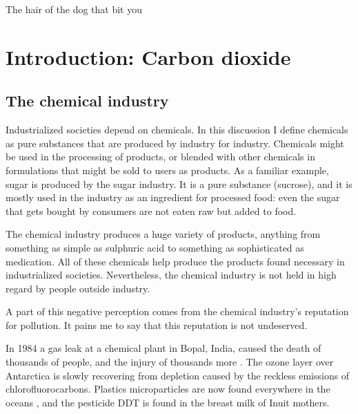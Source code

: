 
\begin{savequote}[45mm]
The hair of the dog that bit you
\end{savequote}

\chapter{Introduction: Carbon dioxide } %

\label{Chapter2} %


\section{The chemical industry}

Industrialized societies depend on chemicals. In this discussion I define
chemicals as pure substances that are produced by industry for industry.
Chemicals might be used in the processing of products, or blended with other
chemicals in formulations that might be sold to users as products. As a familiar
example, sugar is produced by the sugar industry. It is a pure substance
(sucrose), and it is mostly used in the industry as an ingredient for processed
food: even the sugar that gets bought by consumers are not eaten raw but added
to food. 
 
The chemical industry produces a huge variety of products, anything from
something as simple as sulphuric acid to something as sophisticated as
medication. All of these chemicals help produce the products found necessary in
industrialized societies. Nevertheless, the chemical industry is not held in
high regard by people outside industry.

A part of this negative perception comes from the chemical industry's reputation
for pollution. It pains me to say that this reputation is not undeserved. 

In 1984 a gas leak at a chemical plant in Bopal, India, caused the death of
thousands of people, and the injury of thousands more . The ozone layer over
Antarctica is slowly recovering from depletion caused by the reckless emissions
of chlorofluorocarbons. Plastics microparticles are now found everywhere in the
oceans , and the pesticide DDT is found in the breast milk of Inuit
mothers.

